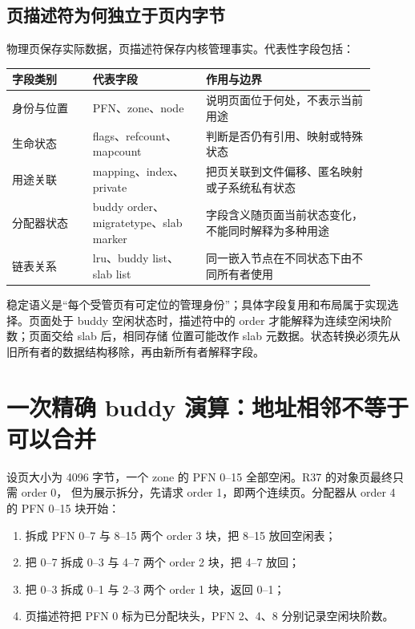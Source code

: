 \subsection{页描述符为何独立于页内字节}

物理页保存实际数据，页描述符保存内核管理事实。代表性字段包括：

\begin{longtable}{|L{0.2\linewidth}|L{0.28\linewidth}|L{0.42\linewidth}|}
\hline
字段类别 & 代表字段 & 作用与边界 \\ \hline
身份与位置 & PFN、zone、node & 说明页面位于何处，不表示当前用途 \\\tablerowrule
生命状态 & flags、refcount、mapcount & 判断是否仍有引用、映射或特殊状态 \\\tablerowrule
用途关联 & mapping、index、private & 把页关联到文件偏移、匿名映射或子系统私有状态 \\\tablerowrule
分配器状态 & buddy order、migratetype、slab marker &
字段含义随页面当前状态变化，不能同时解释为多种用途 \\\tablerowrule
链表关系 & lru、buddy list、slab list & 同一嵌入节点在不同状态下由不同所有者使用 \\
\hline
\end{longtable}

稳定语义是“每个受管页有可定位的管理身份”；具体字段复用和布局属于实现选择。页面处于
buddy 空闲状态时，描述符中的 order 才能解释为连续空闲块阶数；页面交给 slab 后，相同存储
位置可能改作 slab 元数据。状态转换必须先从旧所有者的数据结构移除，再由新所有者解释字段。

\section{一次精确 buddy 演算：地址相邻不等于可以合并}

设页大小为 4096 字节，一个 zone 的 PFN 0--15 全部空闲。R37 的对象页最终只需 order 0，
但为展示拆分，先请求 order 1，即两个连续页。分配器从 order 4 的 PFN 0--15 块开始：

\begin{enumerate}
\tightlist
\item 拆成 PFN 0--7 与 8--15 两个 order 3 块，把 8--15 放回空闲表；
\item 把 0--7 拆成 0--3 与 4--7 两个 order 2 块，把 4--7 放回；
\item 把 0--3 拆成 0--1 与 2--3 两个 order 1 块，返回 0--1；
\item 页描述符把 PFN 0 标为已分配块头，PFN 2、4、8 分别记录空闲块阶数。
\end{enumerate}

